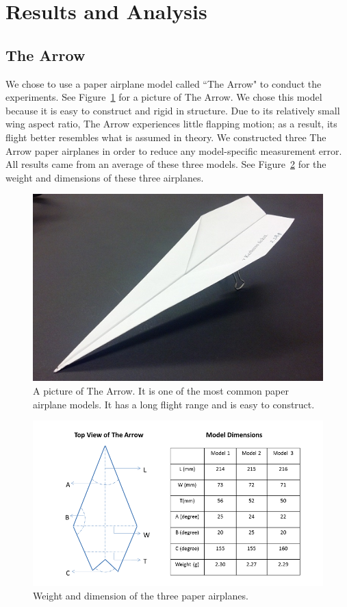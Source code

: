 \section{Results and Analysis}

\subsection{The Arrow}
	\label{sec:arrow}
We chose to use a paper airplane model called ``The Arrow" to conduct the experiments. See Figure~\ref{fig:arrow} for a picture of The Arrow. We chose this model because it is easy to construct and rigid in structure. Due to its relatively small wing aspect ratio, The Arrow experiences little flapping motion; as a result, its flight better resembles what is assumed in theory. We constructed three The Arrow paper airplanes in order to reduce any model-specific measurement error. All results came from an average of these three models. See Figure~\ref{fig:arrowdimension} for the weight and dimensions of these three airplanes. 

\begin{figure}[hl]
  \centering
    \includegraphics[scale=0.6]{figures/arrow.png}
    \caption{A picture of The Arrow. It is one of the most common paper airplane models. It has a long flight range and is easy to construct.}
  \label{fig:arrow}
\end{figure}

\begin{figure}[hl]
  \centering
    \includegraphics[scale=0.6]{figures/arrowdimension.png}
    \caption{Weight and dimension of the three paper airplanes.}
  \label{fig:arrowdimension}
\end{figure}

